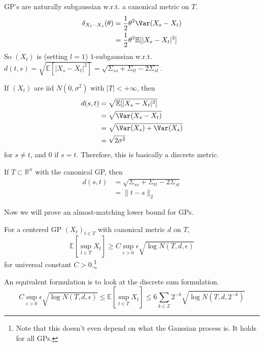 	GP's are naturally subgaussian w.r.t. a canonical metric on $T$. 
	\begin{align}
		\delta_{X_t - X_s} (\theta) & = \frac{1}{2} \theta^2 \Var(X_s - X_t)  \\ 
																& = \frac{1}{2} \theta^2 \mathbb{E}[|X_s - X_t|^2]
	\end{align}
	So $(X_t)$ is (setting $l=1$) $1$-subgaussian w.r.t. $d(t, s) = \sqrt{\mathbb{E}[|X_s - X_t|^2]} = \sqrt{\Sigma_{ss} + \Sigma_{tt} - 2 \Sigma_{st}}$. 

	\begin{example}
	  If $(X_t)$ are iid $N(0, \sigma^2)$ with $|T| < +\infty$, then 
		\begin{align}
			d(s, t) & = \sqrt{\mathbb{E}[|X_s - X_t|^2]} \\ 
							& = \sqrt{\Var(X_s - X_t)} \\ 
							& = \sqrt{\Var(X_s) + \Var(X_s)} \\ 
							& = \sqrt{2 \sigma^2}
		\end{align}
		for $s \neq t$, and $0$ if $s = t$. Therefore, this is basically a discrete metric. 
	\end{example}

	\begin{example}
		If $T \subset \mathbb{R}^n$ with the canonical GP, then 
		\begin{align}
			d(s, t) & = \sqrt{\Sigma_{ss} + \Sigma_{tt} - 2 \Sigma_{st}} \\ 
							& = \|t - s\|_2
		\end{align}
	\end{example}

	Now we will prove an almost-matching lower bound for GPs. 

	\begin{definition}[Sudakov]
		For a centered GP $(X_t)_{t \in T}$ with canonical metric $d$ on $T$, 
		\begin{equation}
			\mathbb{E}[\sup_{t \in T} X_t] \geq C \sup_{\epsilon > 0} \epsilon \sqrt{\log{N(T, d, \epsilon)}}
		\end{equation}
		for universal constant $C > 0$.\footnote{Note that this doesn't even depend on what the Gaussian process is. It holds for all GPs. }
	\end{definition}

	An equivalent formulation is to look at the discrete sum formulation. 
	\begin{equation}
		 C \sup_{\epsilon > 0} \epsilon \sqrt{\log{N(T, d, \epsilon)}} \leq \mathbb{E}[\sup_{t \in T} X_t] \leq 6 \sum_{k \in \mathbb{Z}} 2^{-k} \sqrt{\log{N(T, d, 2^{-k})}}
	\end{equation}


